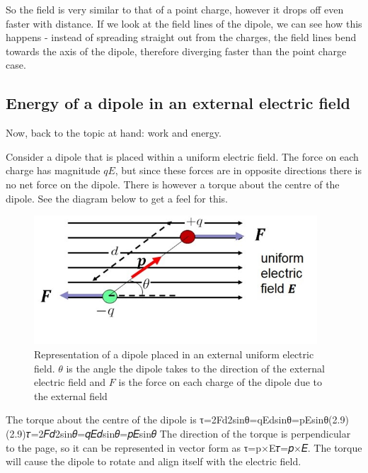 \documentclass[
  letterpaper,
  DIV=11,
  numbers=noendperiod]{scrreprt}
\begin{document}
So the field is very similar to that of a point charge, however it drops
off even faster with distance. If we look at the field lines of the
dipole, we can see how this happens - instead of spreading straight out
from the charges, the field lines bend towards the axis of the dipole,
therefore diverging faster than the point charge case.

\subsection{Energy of a dipole in an external electric
field}\label{energy-of-a-dipole-in-an-external-electric-field}

Now, back to the topic at hand: work and energy.

Consider a dipole that is placed within a uniform electric field. The
force on each charge has magnitude \(qE\), but since these forces are in
opposite directions there is no net force on the dipole. There is
however a torque about the centre of the dipole. See the diagram below
to get a feel for this.

\begin{figure}[H]

{\centering \includegraphics[width=4.16667in,height=\textheight]{Figures/dipole_extE.jpg}

}

\caption{Representation of a dipole placed in an external uniform
electric field. \(\theta\) is the angle the dipole takes to the
direction of the external electric field and \(F\) is the force on each
charge of the dipole due to the external field}

\end{figure}%

The torque about the centre of the dipole is
τ=2Fd2sinθ=qEdsinθ=\textbar p\textbar Esinθ(2.9)(2.9)𝜏=2𝐹𝑑2sin⁡𝜃=𝑞𝐸𝑑sin⁡𝜃=\textbar 𝑝\textbar 𝐸sin⁡𝜃
The direction of the torque is perpendicular to the page, so it can be
represented in vector form as τ=p×E𝜏=𝑝×𝐸. The torque will cause the
dipole to rotate and align itself with the electric field.
\end{document}
